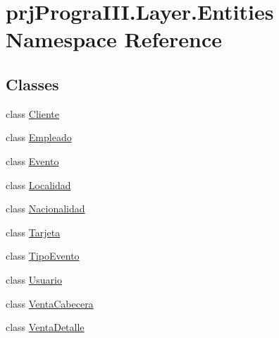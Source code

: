 \hypertarget{namespaceprj_progra_i_i_i_1_1_layer_1_1_entities}{}\section{prj\+Progra\+I\+I\+I.\+Layer.\+Entities Namespace Reference}
\label{namespaceprj_progra_i_i_i_1_1_layer_1_1_entities}
\subsection*{Classes}
\begin{DoxyCompactItemize}
\item 
class \hyperlink{classprj_progra_i_i_i_1_1_layer_1_1_entities_1_1_cliente}{Cliente}
\item 
class \hyperlink{classprj_progra_i_i_i_1_1_layer_1_1_entities_1_1_empleado}{Empleado}
\item 
class \hyperlink{classprj_progra_i_i_i_1_1_layer_1_1_entities_1_1_evento}{Evento}
\item 
class \hyperlink{classprj_progra_i_i_i_1_1_layer_1_1_entities_1_1_localidad}{Localidad}
\item 
class \hyperlink{classprj_progra_i_i_i_1_1_layer_1_1_entities_1_1_nacionalidad}{Nacionalidad}
\item 
class \hyperlink{classprj_progra_i_i_i_1_1_layer_1_1_entities_1_1_tarjeta}{Tarjeta}
\item 
class \hyperlink{classprj_progra_i_i_i_1_1_layer_1_1_entities_1_1_tipo_evento}{Tipo\+Evento}
\item 
class \hyperlink{classprj_progra_i_i_i_1_1_layer_1_1_entities_1_1_usuario}{Usuario}
\item 
class \hyperlink{classprj_progra_i_i_i_1_1_layer_1_1_entities_1_1_venta_cabecera}{Venta\+Cabecera}
\item 
class \hyperlink{classprj_progra_i_i_i_1_1_layer_1_1_entities_1_1_venta_detalle}{Venta\+Detalle}
\end{DoxyCompactItemize}
